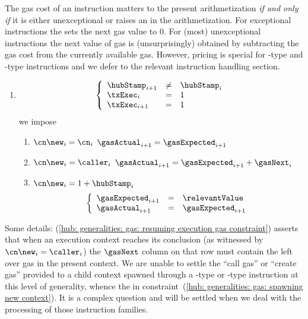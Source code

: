 The gas cost of an instruction matters to the present arithmetization \emph{if and only if} it is either unexceptional or raises an \oogxSH{} in the arithmetization.
For exceptional instructions the \zkEvm{} sets the next gas value to $0$.
For (most) unexceptional instructions the next value of gas is (unsurprisingly) obtained by subtracting the gas cost from the currently available gas.
However, pricing is special for -type and -type instructions and we defer to the relevant instruction handling section.
\begin{enumerate}[resume]
	\item \If 
		\[
			\left\{ \begin{array}{lcl}
				\hubStamp _{i + 1} & \neq & \hubStamp_{i} \\
				\txExec   _{i    } & =    & 1             \\
				\txExec   _{i + 1} & =    & 1             \\
			\end{array} \right.
		\]
		\Then we impose
		\begin{enumerate}
			\item\label{hub: generalities: gas: could blow up} \If $\cn\new_{i} = \cn_{i}$ \Then $\gasActual_{i + 1} = \gasExpected_{i + 1}$
			\item\label{hub: generalities: gas: resuming execution gas constraint} \If $\cn\new_{i} = \caller_{i}$ \Then
				$\gasActual_{i + 1} = \gasExpected_{i + 1} + \gasNext_{i}$
			\item\label{hub: generalities: gas: spawning new context} \If $\cn\new_{i} = 1 + \hubStamp_{i}$ \Then 
				\[
					\left\{ \begin{array}{lcl}
						\gasExpected_{i + 1} & = & \relevantValue            \\
						\gasActual_{i + 1}   & = & \gasExpected_{i + 1} \\
					\end{array} \right.
				\]
		\end{enumerate}
\end{enumerate}
Some details:
(\ref{hub: generalities: gas: resuming execution gas constraint}) asserts that when an execution context reaches its conclusion (as witnessed by $\cn\new_{i} = \caller_{i}$) the $\gasNext$ column on that row must contain the left over gas in the present context.
We are unable to settle the ``call gas'' or ``create gas'' provided to a child context spawned through a -type or -type instruction at this level of generality, whence the \relevantValue{} in constraint~(\ref{hub: generalities: gas: spawning new context}). It is a complex question and will be settled when we deal with the processing of those instruction families.

